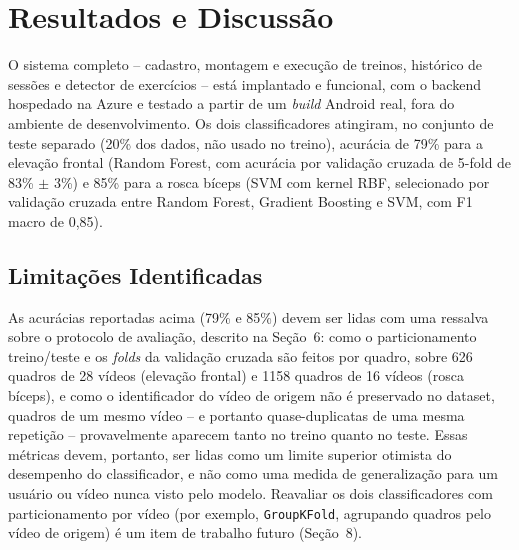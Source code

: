 \documentclass[12pt]{article}
\begin{document}
\section{Resultados e Discussão}

O sistema completo -- cadastro, montagem e execução de treinos, histórico
de sessões e detector de exercícios -- está implantado e funcional, com o
backend hospedado na Azure e testado a partir de um \textit{build} Android
real, fora do ambiente de desenvolvimento. Os dois classificadores
atingiram, no conjunto de teste separado (20\% dos dados, não usado no
treino), acurácia de 79\% para a elevação frontal (Random Forest, com
acurácia por validação cruzada de 5-fold de 83\% $\pm$ 3\%) e 85\% para a
rosca bíceps (SVM com kernel RBF, selecionado por validação cruzada entre
Random Forest, Gradient Boosting e SVM, com F1 macro de 0,85).

\subsection{Limitações Identificadas}

As acurácias reportadas acima (79\% e 85\%) devem ser lidas com uma
ressalva sobre o protocolo de avaliação, descrito na Seção~6: como o
particionamento treino/teste e os \textit{folds} da validação cruzada são
feitos por quadro, sobre 626 quadros de 28 vídeos (elevação frontal) e
1158 quadros de 16 vídeos (rosca bíceps), e como o identificador do vídeo
de origem não é preservado no dataset, quadros de um mesmo vídeo -- e
portanto quase-duplicatas de uma mesma repetição -- provavelmente aparecem
tanto no treino quanto no teste. Essas métricas devem, portanto, ser lidas
como um limite superior otimista do desempenho do classificador, e não
como uma medida de generalização para um usuário ou vídeo nunca visto pelo
modelo. Reavaliar os dois classificadores com particionamento por vídeo
(por exemplo, \texttt{GroupKFold}, agrupando quadros pelo vídeo de origem)
é um item de trabalho futuro (Seção~8).
\end{document}
